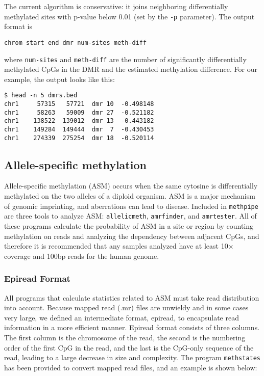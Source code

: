 \documentclass[10pt]{article}
\newcommand{\prog}[1]{\texttt{#1}}
\begin{document}
The current algorithm is conservative: it joins neighboring differentially
methylated sites with p-value below 0.01 (set by the {\tt -p} parameter). The 
output format is
{\small{%
\begin{verbatim}
chrom start end dmr num-sites meth-diff
\end{verbatim}%
}}
\noindent where {\tt num-sites} and {\tt meth-diff} are the number of 
significantly differentially methylated CpGs in the DMR and the estimated 
methylation difference. For our example, the output looks like this:
{\small{%
\begin{verbatim}
$ head -n 5 dmrs.bed
chr1	 57315	 57721	dmr	10	-0.498148
chr1	 58263	 59009	dmr	27	-0.521182
chr1	138522	139012	dmr	13	-0.443182
chr1	149284	149444	dmr	 7	-0.430453
chr1	274339	275254	dmr	18	-0.520114
\end{verbatim}%

\subsection{Allele-specific methylation}

Allele-specific methylation (ASM) occurs when the same cytosine is
differentially methylated on the two alleles of a diploid organism.
ASM is a major mechanism of genomic imprinting, and aberrations can
lead to disease. Included in \prog{methpipe} are three tools to
analyze ASM: \prog{allelicmeth}, \prog{amrfinder}, and \prog{amrtester}.
All of these programs calculate the probability of ASM in a site or
region by counting methylation on reads and analyzing the dependency
between adjacent CpGs, and therefore it is recommended that any samples
analyzed have at least 10$\times$ coverage and 100bp reads for the human
genome.

\subsubsection{Epiread Format}

All programs that calculate statistics related to ASM must take read
distribution into account. Because mapped read (.mr) files are unwieldy
and in some cases very large, we defined an intermediate format, epiread,
to encapsulate read information in a more efficient manner. Epiread format
consists of three columns. The first column is the chromosome of the read,
the second is the numbering order of the first CpG in the read, and the
last is the CpG-only sequence of the read, leading to a large decrease in
size and complexity. The program \prog{methstates} has been provided to
convert mapped read files, and an example is shown below:

}}
\end{document}
